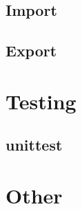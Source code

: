 \documentclass{article}
\begin{document}
\subsection*{Import}

\subsection*{Export}

\newpage
\section*{Testing}
\subsection*{unittest}

\newpage
\section*{Other}
\end{document}
